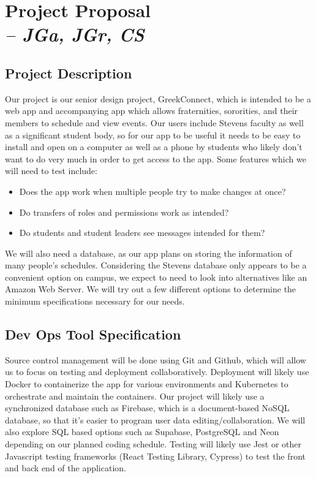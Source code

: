 \chapter{Project Proposal \\
\small{\textit{-- JGa, JGr, CS}}
\label{Chapter::ProjectProposal}}
\section{Project Description}

Our project is our senior design project, GreekConnect, which is intended to be a web app and accompanying app which allows fraternities, sororities, and their members to schedule and view events.  Our users include Stevens faculty as well as a significant student body, so for our app to be useful it needs to be easy to install and open on a computer as well as a phone by students who likely don’t want to do very much in order to get access to the app.  Some features which we will need to test include:

\begin{itemize}
\item Does the app work when multiple people try to make changes at once?
\item Do transfers of roles and permissions work as intended?
\item Do students and student leaders see messages intended for them?
\end{itemize}

We will also need a database, as our app plans on storing the information of many people’s schedules.  Considering the Stevens database only appears to be a convenient option on campus, we expect to need to look into alternatives like an Amazon Web Server.  We will try out a few different options to determine the minimum specifications necessary for our needs.

\section{Dev Ops Tool Specification}
Source control management will be done using Git and Github, which will allow us to focus on testing and deployment collaboratively.
Deployment will likely use Docker to containerize the app for various environments and Kubernetes to orchestrate and maintain the containers.
Our project will likely use a synchronized database such as Firebase, which is a document-based NoSQL database, so that it’s easier to program user data editing/collaboration. We will also explore SQL based options such as Supabase, PostgreSQL and Neon depending on our planned coding schedule.
Testing will likely use Jest or other Javascript testing frameworks (React Testing Library, Cypress) to test the front and back end of the application. 
